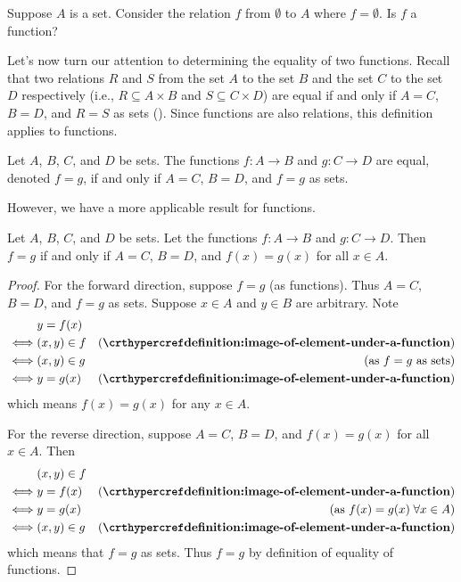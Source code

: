 \begin{exercise}\label{exercise:empty-function}
    Suppose $A$ is a set. Consider the relation $f$ from $\emptyset$ to $A$ where $f = \emptyset$. Is $f$ a function?
\end{exercise}

Let's now turn our attention to determining the equality of two functions. Recall that two relations $R$ and $S$ from the set $A$ to the set $B$ and the set $C$ to the set $D$ respectively (i.e., $R \subseteq A \times B$ and $S \subseteq C \times D$) are equal if and only if $A = C$, $B = D$, and $R = S$ as sets (). Since functions are also relations, this definition applies to functions.

\begin{definition}
    Let $A$, $B$, $C$, and $D$ be sets. The functions $f: A \to B$ and $g: C \to D$ are equal, denoted $f = g$, if and only if $A = C$, $B = D$, and $f = g$ as sets.
\end{definition}

However, we have a more applicable result for functions.
\begin{theorem}
    Let $A$, $B$, $C$, and $D$ be sets. Let the functions $f: A \to B$ and $g: C \to D$. Then $f = g$ if and only if $A = C$, $B = D$, and $f(x) = g(x)$ for all $x \in A$.
\end{theorem}
\begin{proof}
    For the forward direction, suppose $f = g$ (as functions). Thus $A = C$, $B = D$, and $f = g$ as sets. Suppose $x \in A$ and $y \in B$ are arbitrary. Note
    \begin{align*}
        & y = f(x)\\
        \iff& (x, y) \in f & (\myref{definition:image-of-element-under-a-function})\\
        \iff& (x, y) \in g & (\text{as } f = g \text{ as sets})\\
        \iff& y = g(x) & (\myref{definition:image-of-element-under-a-function})
    \end{align*}
    which means $f(x) = g(x)$ for any $x \in A$.

    For the reverse direction, suppose $A = C$, $B = D$, and $f(x) = g(x)$ for all $x \in A$. Then
    \begin{align*}
        & (x, y) \in f\\
        \iff& y = f(x) & (\myref{definition:image-of-element-under-a-function})\\
        \iff& y = g(x) & (\text{as } f(x) = g(x)\;\forall x \in A)\\
        \iff& (x, y) \in g & (\myref{definition:image-of-element-under-a-function})
    \end{align*}
    which means that $f = g$ as sets. Thus $f = g$ by definition of equality of functions.
\end{proof}

